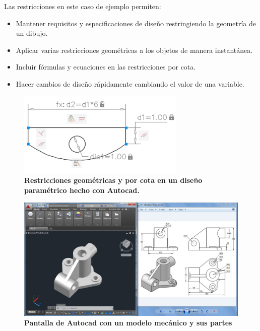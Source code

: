 Las restricciones en este caso de ejemplo permiten:

\begin{itemize}
    \item Mantener requisitos y especificaciones de diseño restringiendo la geometría de un dibujo.
    \item Aplicar varias restricciones geométricas a los objetos de manera instantánea.
    \item Incluir fórmulas y ecuaciones en las restricciones por cota.
    \item Hacer cambios de diseño rápidamente cambiando el valor de una variable.
\end{itemize}



\begin{figure}[h]
\includegraphics[width=8cm]{Img/CPD/autocad-0.png}
\centering
\caption{\textbf{\footnotesize{Restricciones geométricas y por cota en un diseño paramétrico hecho con Autocad.}}}
\label{fig:autocad-0}
\end{figure}

\begin{figure}[h]
\includegraphics[width=14cm]{Img/CPD/autocad.jpg}
\centering
\caption{\textbf{\footnotesize{Pantalla de Autocad con un modelo mecánico y sus partes}}}
\end{figure}

\clearpage
